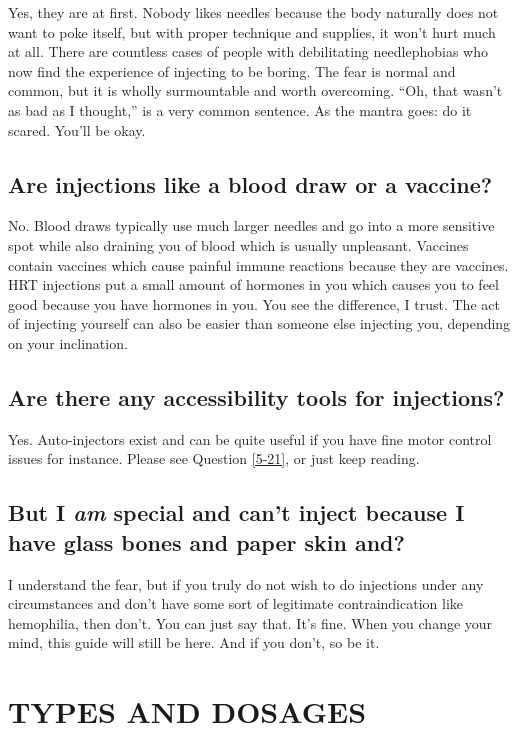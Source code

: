 \documentclass{article}
\begin{document}
Yes, they are at first. Nobody likes needles because the body naturally does not want to poke itself, but with proper technique and supplies, it won’t hurt much at all. There are countless cases of people with debilitating needlephobias who now find the experience of injecting to be boring. The fear is normal and common, but it is wholly surmountable and worth overcoming. “Oh, that wasn’t as bad as I thought,” is a very common sentence. As the mantra goes: do it scared. You’ll be okay.

\subsection{Are injections like a blood draw or a vaccine?}

No. Blood draws typically use much larger needles and go into a more sensitive spot while also draining you of blood which is usually unpleasant. Vaccines contain vaccines which cause painful immune reactions because they are vaccines. HRT injections put a small amount of hormones in you which causes you to feel good because you have hormones in you. You see the difference, I trust. The act of injecting yourself can also be easier than someone else injecting you, depending on your inclination.

\subsection{Are there any accessibility tools for injections?}

Yes. Auto-injectors exist and can be quite useful if you have fine motor control issues for instance. Please see Question \ref{5-21}, or just keep reading.

\subsection{But I \textit{am} special and can’t inject because I have glass bones and paper skin and\textemdash{}?}

I understand the fear, but if you truly do not wish to do injections under any circumstances and don’t have some sort of legitimate contraindication like hemophilia, then don’t. You can just say that. It’s fine. When you change your mind, this guide will still be here. And if you don’t, so be it. 

 

\section{TYPES AND DOSAGES}\label{td}
\end{document}
